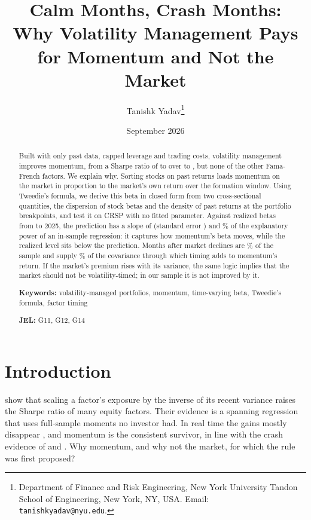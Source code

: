 \documentclass[11pt]{article}
\title{Calm Months, Crash Months:\\Why Volatility Management Pays for Momentum and Not the Market}
\author{Tanishk Yadav\thanks{Department of Finance and Risk Engineering, New York University Tandon School of Engineering, New York, NY, USA. Email: \texttt{tanishkyadav@nyu.edu}.}}
\date{September 2026}
\begin{document}
\maketitle

\begin{abstract}
\noindent
Built with only past data, capped leverage and trading costs, volatility management improves momentum, from a Sharpe ratio of \MomOrig{} to \MomNet{} over \RTstart{} to \RTend{}, but none of the other Fama-French factors. We explain why. Sorting stocks on past returns loads momentum on the market in proportion to the market's own return over the formation window. Using Tweedie's formula, we derive this beta in closed form from two cross-sectional quantities, the dispersion of stock betas and the density of past returns at the portfolio breakpoints, and test it on CRSP with no fitted parameter. Against realized betas from \MechFirstYear{} to 2025, the prediction has a slope of \MechCFull{} (standard error \MechCSeFull{}) and \MechShareFull\% of the explanatory power of an in-sample regression: it captures how momentum's beta moves, while the realized level sits \MechDAbsFull{} below the prediction. Months after market declines are \LOneShareMonths\% of the sample and supply \LOneShareCov\% of the covariance through which timing adds to momentum's return. If the market's premium rises with its variance, the same logic implies that the market should not be volatility-timed; in our sample it is not improved by it.

\medskip\noindent\textbf{Keywords:} volatility-managed portfolios, momentum, time-varying beta, Tweedie's formula, factor timing

\noindent\textbf{JEL:} G11, G12, G14
\end{abstract}

\section{Introduction}

\citet{moreira2017} show that scaling a factor's exposure by the inverse of its recent variance raises the Sharpe ratio of many equity factors. Their evidence is a spanning regression that uses full-sample moments no investor had. In real time the gains mostly disappear \citep{cederburg2020,liu2019,barroso2021}, and momentum is the consistent survivor, in line with the crash evidence of \citet{barroso2015} and \citet{daniel2016}. Why momentum, and why not the market, for which the rule was first proposed?
\end{document}

